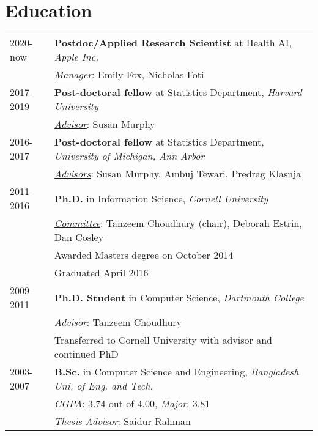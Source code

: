\documentclass[10pt,fullpage]{article}
\begin{document}
\section*{\textbf{Education}}
\vspace{-1em}
\begin{longtable}{p{0.7in}|p{5.5in}}
		2020-now & {\bf Postdoc/Applied Research Scientist} at Health AI, {\it Apple Inc.} \\
			& \underline{{\it Manager}}: Emily Fox, Nicholas Foti\vspace{0.15cm}\\
		2017-2019 & {\bf Post-doctoral fellow} at Statistics Department, {\it Harvard University} \\
			& \underline{{\it Advisor}}: Susan Murphy\vspace{0.15cm}\\
	2016-2017 & {\bf Post-doctoral fellow} at Statistics Department, {\it University of Michigan, Ann Arbor} \\
			& \underline{{\it Advisors}}: Susan Murphy, Ambuj Tewari, Predrag Klasnja\vspace{0.15cm}\\	2011-2016 & {\bf Ph.D.} in Information Science, {\it Cornell University} \\
			& \underline{{\it Committee}}: Tanzeem Choudhury (chair), Deborah Estrin, Dan Cosley\\
			& Awarded Masters degree on October 2014 \\
			& Graduated April 2016\vspace{0.15cm}\\
	2009-2011& {\bf Ph.D. Student} in Computer Science, {\it Dartmouth College} \\
			& \underline{{\it Advisor}}: Tanzeem Choudhury \\
			&Transferred to Cornell University with advisor and continued PhD\vspace{0.15cm}\\
	2003-2007 & {\bf B.Sc.} in Computer Science and Engineering, {\it Bangladesh Uni. of Eng. and Tech.}\\
			& \underline{{\it CGPA}}: 3.74 out of 4.00, \underline{{\it Major}}: 3.81\\
			& \underline{{\it Thesis Advisor}}: Saidur Rahman\\
\end{longtable}
\end{document}
